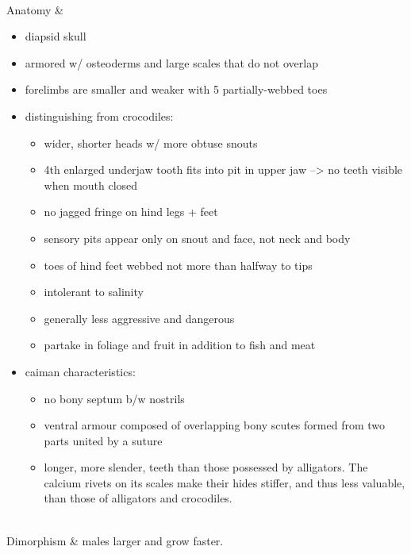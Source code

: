 \begin{center}
\begin{longtabu}
	 \\
	\hline
	Anatomy &
	\begin{itemize}[noitemsep]
		\item diapsid skull
		\item armored w/ osteoderms and large scales that do not overlap
		\item forelimbs are smaller and weaker with 5 partially-webbed toes
		\item distinguishing from crocodiles:
			\begin{itemize}[noitemsep]
				\item wider, shorter heads w/ more obtuse snouts
				\item 4th enlarged underjaw tooth fits into pit in upper jaw --> no teeth visible when mouth closed
				\item no jagged fringe on hind legs + feet
				\item sensory pits appear only on snout and face, not neck and body
				\item toes of hind feet webbed not more than halfway to tips
				\item intolerant to salinity
				\item generally less aggressive and dangerous
				\item partake in foliage and fruit in addition to fish and meat
			\end{itemize}
		\item caiman characteristics:
			\begin{itemize}[noitemsep]
				\item no bony septum b/w nostrils
				\item ventral armour composed of overlapping bony scutes formed from two parts united by a suture
				\item longer, more slender, teeth than those possessed by alligators. The calcium rivets on its scales make their hides stiffer, and thus less valuable, than those of alligators and crocodiles.
			\end{itemize}
	\end{itemize}
				
	 \\
	\hline
	Dimorphism & 
	males larger and grow faster.
	

\end{longtabu}
\end{center}
